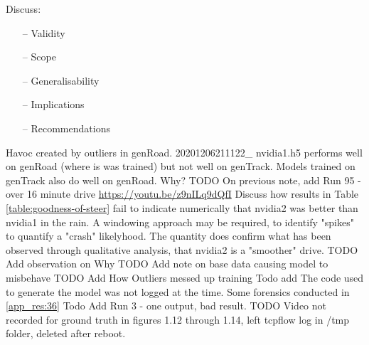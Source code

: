 

Discuss:
\begin{itemize}
    \item[--] Validity
    \item[--] Scope
    \item[--] Generalisability
    \item[--] Implications
    \item[--] Recommendations
\end{itemize}
Havoc created by outliers in genRoad. 20201206211122\_ nvidia1.h5 performs well on genRoad (where is was trained) but not well on genTrack. Models trained on genTrack also do well on genRoad. Why?
TODO On previous note, add Run 95 - over 16 minute drive \url{https://youtu.be/z9nILq9dQfI}  
Discuss how results in Table \ref{table:goodness-of-steer} fail to indicate numerically that nvidia2 was better than nvidia1 in the rain. A windowing approach may be required, to identify "spikes" to quantify a "crash" likelyhood. The quantity does confirm what has been observed through qualitative analysis, that nvidia2 is a "smoother" drive.  
TODO Add observation on Why
TODO Add note on base data causing model to misbehave
TODO Add How Outliers messed up training
Todo add The code used to generate the model was not logged at the time. Some forensics conducted in \ref{app_res:36}
Todo Add Run 3 - one output, bad result.
TODO Video not recorded for ground truth in figures 1.12 through 1.14, left tcpflow log in /tmp folder, deleted after reboot.

